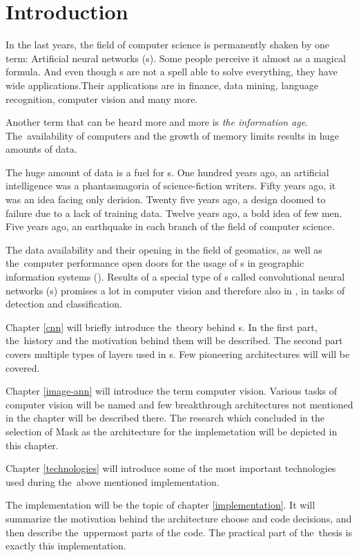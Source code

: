 \chapter{Introduction}
\label{intro}

In the last years, the field of computer science is permanently shaken by one 
term: Artificial neural networks (s). Some people perceive it almost as 
a magical formula. And even though s are not a spell able to solve 
everything, they have wide applications.Their applications are in finance, data 
mining, language recognition, computer vision and many more.

Another term that can be heard more and more is \textit{the information age}. 
The~availability of computers and the growth of memory limits results in huge 
amounts of data.

The huge amount of data is a fuel for s. One hundred years ago, an 
artificial intelligence was a phantasmagoria of science-fiction writers. Fifty 
years ago, it was an idea facing only derision. Twenty five years ago, a design 
doomed to failure due to a lack of training data. Twelve years ago, a bold idea 
of few men. Five years ago, an earthquake in each branch of the field of 
computer science.

The data availability and their opening in the field of geomatics, as well as 
the~computer performance open doors for the usage of s in geographic 
information systems (). Results of a special type of s called 
convolutional neural networks (s) promises a lot in computer vision and 
therefore also in , in tasks of detection and classification.

Chapter \ref{cnn} will briefly introduce the~theory behind s. In the 
first part, the~history and the motivation behind them will be described. The 
second part covers multiple types of layers used in s. Few pioneering 
architectures will will be covered.

Chapter \ref{image-ann} will introduce the term computer vision. Various tasks 
of computer vision will be named and few breakthrough architectures not 
mentioned in the  chapter will be described there. The research which 
concluded in the selection of Mask  as the architecture for the 
implemetation will be depicted in this chapter.

Chapter \ref{technologies} will introduce some of the most important 
technologies used during
the~above mentioned implementation.

The implementation will be the topic of chapter \ref{implementation}. It will 
summarize the motivation behind the architecture choose and code decisions, and 
then describe the~uppermost parts of the code. The practical part of the~thesis 
is exactly this implementation.

